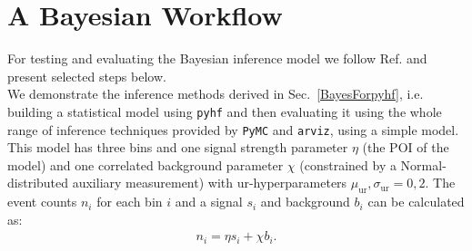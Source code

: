 \section{A Bayesian Workflow}{\label{BaysWF}} For testing and evaluating the Bayesian inference model we follow Ref. \cite{Betancourt2020} and present selected steps below. \\

\noindent We demonstrate the inference methods derived in Sec.~\ref{BayesForpyhf}, i.e. building a statistical model using \texttt{pyhf} and then evaluating it using the whole range of inference techniques provided by \texttt{PyMC} and \texttt{arviz}, using a simple model. This model has three bins and one signal strength parameter $\eta$ (the POI of the model) and one correlated background parameter $\chi$ (constrained by a Normal-distributed auxiliary measurement) with ur-hyperparameters $\mu_{\text{ur}}, \sigma_{\text{ur}} = 0, 2$. The event counts $n_i$ for each bin $i$ and a signal $s_i$ and background $b_i$ can be calculated as:
    \begin{align} \label{binCounts}
        n_i = \eta s_i + \chi b_i.
    \end{align}


